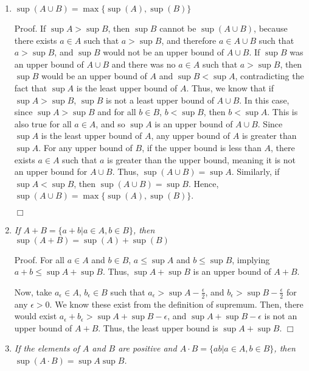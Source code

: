\documentclass[
]{article}
\begin{document}
\begin{enumerate} 
\item $\sup (A \cup B) = \max\{\sup (A), \sup (B)\}$  

Proof. \linebreak  
If $\sup A > \sup B$, then $\sup B$ cannot be $\sup(A \cup B)$, because there exists $a \in A$ such that $a > \sup B$, and therefore $a \in A \cup B$ such that $a > \sup B$, and $\sup B$ would not be an upper bound of $A \cup B$. If $\sup B$ was an upper bound of $A \cup B$ and there was no $a \in A$ such that $a > \sup B$, then $\sup B$ would be an upper bound of $A$ and $\sup B < \sup A$, contradicting the fact that $\sup A$ is the least upper bound of $A$. Thus, we know that if $\sup A > \sup B$, $\sup B$ is not a least upper bound of $A \cup B$. In this case, since $\sup A > \sup B$ and for all $b \in B$, $b < \sup B$, then $b < \sup A$. This is also true for all $a \in A$, and so $\sup A$ is an upper bound of $A \cup B$. Since $\sup A$ is the least upper bound of $A$, any upper bound of $A$ is greater than $\sup A$. For any upper bound of $B$, if the upper bound is less than $A$, there exists $a \in A$ such that $a$ is greater than the upper bound, meaning it is not an upper bound for $A \cup B$. Thus, $\sup (A \cup B) = \sup A$. \linebreak
Similarly, if $\sup A < \sup B$, then $\sup (A \cup B) = \sup B$. Hence, $\sup (A \cup B) = \max\{\sup (A), \sup (B)\}$.  

\hfill $\Box$
\item \textit{If $A+B = \{a + b | a \in A, b \in B\}$, then $\sup (A + B) = \sup (A) + \sup (B)$}  

Proof. \linebreak
For all $a \in A$ and $b \in B$, $a \leq \sup A$ and $b \leq \sup B$, implying $a + b \leq \sup A + \sup B$. Thus, $\sup A + \sup B$ is an upper bound of $A + B$.  

Now, take $a_ \epsilon \in A$, $b_\epsilon \in B$ such that $a_\epsilon > \sup A - \frac{\epsilon}{2}$, and $b_\epsilon > \sup B - \frac{\epsilon}{2}$ for any $\epsilon > 0$. We know these exist from the definition of supremum. Then, there would exist $a_\epsilon + b_\epsilon > \sup A + \sup B - \epsilon$, and $\sup A + \sup B - \epsilon$ is not an upper bound of $A+B$. Thus, the least upper bound is $\sup A + \sup B$.  
\hfill $\Box$
\item \textit{If the elements of $A$ and $B$ are positive and $A \cdot B = \{ab | a \in A, b \in B\}$, then $\sup (A \cdot B) = \sup A \sup B$.}  


\end{enumerate}
\end{document}
